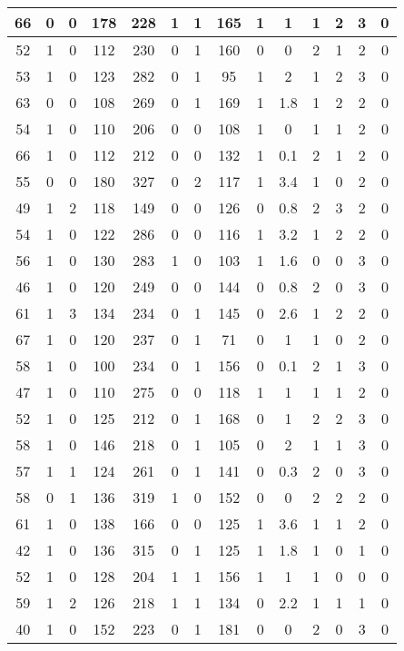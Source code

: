 \documentclass{article}
\begin{document}
\begin{longtable}{|c|c|c|c|c|c|c|c|c|c|c|c|c|c|}
\hline
66 & 0 & 0 & 178 & 228 & 1 & 1 & 165 & 1 & 1 & 1 & 2 & 3 & 0\\
\hline
52 & 1 & 0 & 112 & 230 & 0 & 1 & 160 & 0 & 0 & 2 & 1 & 2 & 0\\
\hline
53 & 1 & 0 & 123 & 282 & 0 & 1 & 95 & 1 & 2 & 1 & 2 & 3 & 0\\
\hline
63 & 0 & 0 & 108 & 269 & 0 & 1 & 169 & 1 & 1.8 & 1 & 2 & 2 & 0\\
\hline
54 & 1 & 0 & 110 & 206 & 0 & 0 & 108 & 1 & 0 & 1 & 1 & 2 & 0\\
\hline
66 & 1 & 0 & 112 & 212 & 0 & 0 & 132 & 1 & 0.1 & 2 & 1 & 2 & 0\\
\hline
55 & 0 & 0 & 180 & 327 & 0 & 2 & 117 & 1 & 3.4 & 1 & 0 & 2 & 0\\
\hline
49 & 1 & 2 & 118 & 149 & 0 & 0 & 126 & 0 & 0.8 & 2 & 3 & 2 & 0\\
\hline
54 & 1 & 0 & 122 & 286 & 0 & 0 & 116 & 1 & 3.2 & 1 & 2 & 2 & 0\\
\hline
56 & 1 & 0 & 130 & 283 & 1 & 0 & 103 & 1 & 1.6 & 0 & 0 & 3 & 0\\
\hline
46 & 1 & 0 & 120 & 249 & 0 & 0 & 144 & 0 & 0.8 & 2 & 0 & 3 & 0\\
\hline
61 & 1 & 3 & 134 & 234 & 0 & 1 & 145 & 0 & 2.6 & 1 & 2 & 2 & 0\\
\hline
67 & 1 & 0 & 120 & 237 & 0 & 1 & 71 & 0 & 1 & 1 & 0 & 2 & 0\\
\hline
58 & 1 & 0 & 100 & 234 & 0 & 1 & 156 & 0 & 0.1 & 2 & 1 & 3 & 0\\
\hline
47 & 1 & 0 & 110 & 275 & 0 & 0 & 118 & 1 & 1 & 1 & 1 & 2 & 0\\
\hline
52 & 1 & 0 & 125 & 212 & 0 & 1 & 168 & 0 & 1 & 2 & 2 & 3 & 0\\
\hline
58 & 1 & 0 & 146 & 218 & 0 & 1 & 105 & 0 & 2 & 1 & 1 & 3 & 0\\
\hline
57 & 1 & 1 & 124 & 261 & 0 & 1 & 141 & 0 & 0.3 & 2 & 0 & 3 & 0\\
\hline
58 & 0 & 1 & 136 & 319 & 1 & 0 & 152 & 0 & 0 & 2 & 2 & 2 & 0\\
\hline
61 & 1 & 0 & 138 & 166 & 0 & 0 & 125 & 1 & 3.6 & 1 & 1 & 2 & 0\\
\hline
42 & 1 & 0 & 136 & 315 & 0 & 1 & 125 & 1 & 1.8 & 1 & 0 & 1 & 0\\
\hline
52 & 1 & 0 & 128 & 204 & 1 & 1 & 156 & 1 & 1 & 1 & 0 & 0 & 0\\
\hline
59 & 1 & 2 & 126 & 218 & 1 & 1 & 134 & 0 & 2.2 & 1 & 1 & 1 & 0\\
\hline
40 & 1 & 0 & 152 & 223 & 0 & 1 & 181 & 0 & 0 & 2 & 0 & 3 & 0\\

\end{longtable}
\end{document}
